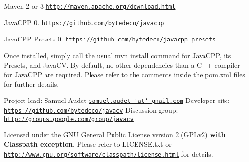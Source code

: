\begin{DoxyItemize}
\item Maven 2 or 3 \href{http://maven.apache.org/download.html}{\tt http\+://maven.\+apache.\+org/download.\+html}
\item Java\+C\+P\+P 0. \href{https://github.com/bytedeco/javacpp}{\tt https\+://github.\+com/bytedeco/javacpp}
\item Java\+C\+P\+P Presets 0. \href{https://github.com/bytedeco/javacpp-presets}{\tt https\+://github.\+com/bytedeco/javacpp-\/presets}
\end{DoxyItemize}

Once installed, simply call the usual {\ttfamily mvn install} command for Java\+C\+P\+P, its Presets, and Java\+C\+V. By default, no other dependencies than a C++ compiler for Java\+C\+P\+P are required. Please refer to the comments inside the {\ttfamily pom.\+xml} files for further details.



 Project lead\+: Samuel Audet \href{mailto:samuel.audet at gmail.com}{\tt samuel.\+audet `at` gmail.\+com} Developer site\+: \href{https://github.com/bytedeco/javacv}{\tt https\+://github.\+com/bytedeco/javacv} Discussion group\+: \href{http://groups.google.com/group/javacv}{\tt http\+://groups.\+google.\+com/group/javacv}

Licensed under the G\+N\+U General Public License version 2 (G\+P\+Lv2) {\bfseries with Classpath exception}. Please refer to L\+I\+C\+E\+N\+S\+E.\+txt or \href{http://www.gnu.org/software/classpath/license.html}{\tt http\+://www.\+gnu.\+org/software/classpath/license.\+html} for details. 